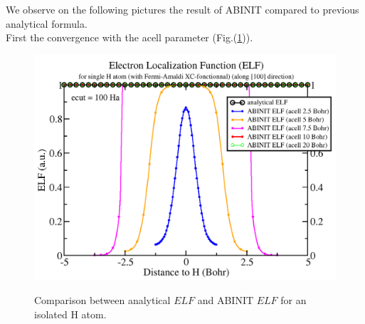 \documentclass[a4paper,12pt]{report}
\begin{document}
We observe on the following pictures the result of ABINIT compared to previous analytical formula.\\
First the convergence with the acell parameter (Fig.(\ref{fig1})).

\begin{figure}[!h]
\centering
\begin{minipage}[c]{1.0\textwidth}
\includegraphics[width = \textwidth]{fig1}
\end{minipage}
\vspace{0.12\textwidth}
\begin{minipage}[c]{0.8\textwidth}
\caption{\small Comparison between analytical $ELF$ and ABINIT $ELF$ for an isolated H atom.}
\vspace*{1.0ex}
\label{fig1}
\end{minipage}
\end{figure}
\end{document}
